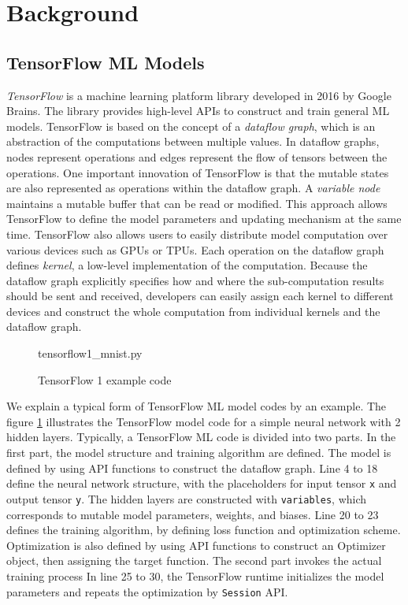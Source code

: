\section{Background}\label{sec:background}
\subsection{TensorFlow ML Models}

\textit{TensorFlow}\cite{tensorflow} is a machine learning platform library
developed in 2016 by Google Brains.
The library provides high-level APIs to construct and train general ML models.
TensorFlow is based on the concept of a \textit{dataflow graph},
which is an abstraction of the computations between
multiple values.
In dataflow graphs, nodes represent operations and
edges represent the flow of tensors between the operations.
One important innovation of TensorFlow
is that the mutable states are also represented as operations
within the dataflow graph. 
A \textit{variable node} maintains a mutable buffer that can be read or modified.
This approach allows TensorFlow to define the model parameters
and updating mechanism at the same time.
TensorFlow also allows users to easily distribute model computation over
various devices such as GPUs or TPUs.
Each operation on the dataflow graph defines \textit{kernel},
a low-level implementation of the computation.
Because the dataflow graph explicitly specifies how
and where the sub-computation results should be sent and received,
developers can easily assign each kernel to different devices and construct
the whole computation from individual kernels and the dataflow graph.

\begin{figure}

{tensorflow1_mnist.py}
\caption{TensorFlow 1 example code}
\label{fig:back:tf1}
\end{figure}

We explain a typical form of TensorFlow ML model codes by an example.
The figure \ref{fig:back:tf1} illustrates the TensorFlow model code for
a simple neural network with 2 hidden layers.
Typically, a TensorFlow ML code is divided into two parts.
In the first part, the model structure and training algorithm are defined.
The model is defined by using API functions to construct the dataflow graph.
Line 4 to 18 define the neural network structure,
with the placeholders for input tensor {\tt x} and output tensor {\tt y}.
The hidden layers are constructed with {\tt variables},
which corresponds to mutable model parameters, weights, and biases.  
Line 20 to 23 defines the training algorithm, 
by defining loss function and optimization scheme.
Optimization is also defined by using API functions to construct
an Optimizer object, then assigning the target function.
The second part invokes the actual training process
In line 25 to 30, the TensorFlow runtime initializes the model parameters
and repeats the optimization by {\tt Session} API. 

